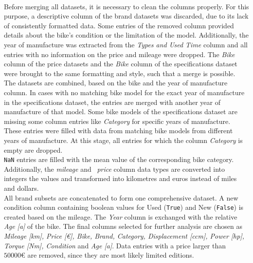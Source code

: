 \\ Before merging all datasets, it is necessary to clean the columns properly. For this purpose, a descriptive column of the brand datasets
was discarded, due to its lack of consistently formatted data. Some entries of the removed column provided details about
the bike's condition or the limitation of the model. Additionally, the year of manufacture was extracted from the \textit{Types and Used Time}
column and all entries with no information on the price and mileage were dropped. The \textit{Bike} column of the price datasets
and the \textit{Bike} column of the specifications dataset were brought to the same formatting and style, such that a merge is possible.\\
The datasets are combined, based on the bike and the year of manufacture column. In cases with no matching
bike model for the exact year of manufacture in the specifications dataset, the entries are merged with another year of manufacture 
of that model. Some bike models of the specifications dataset are missing some column entries like \textit{Category} for specific years
of manufacture. These entries were filled with data from matching bike models from different years of manufacture.
At this stage, all entries for which the column \textit{Category} is empty are dropped.\\
\texttt{NaN} entries are filled with the mean value of the corresponding bike category. Additionally, the \textit{mileage} and  \textit{price} column data types are converted 
into integers the values and transformed into kilometres and euros instead of miles and dollars.\\
All brand subsets are concatenated to form one comprehensive dataset. A new condition column containing boolean values for 
Used (\texttt{True}) and New (\texttt{False}) is created based on the mileage. The \textit{Year} column is exchanged with the relative \textit{Age [a]} of the bike.
The final columns selected for further analysis are chosen as \textit{Mileage [km], Price [€], Bike, 
Brand, Category, Displacement [ccm], Power [hp], Torque [Nm], Condition} and \textit{Age [a]}. Data entries with a price larger than $\qty{50000} €$
are removed, since they are most likely limited editions.
